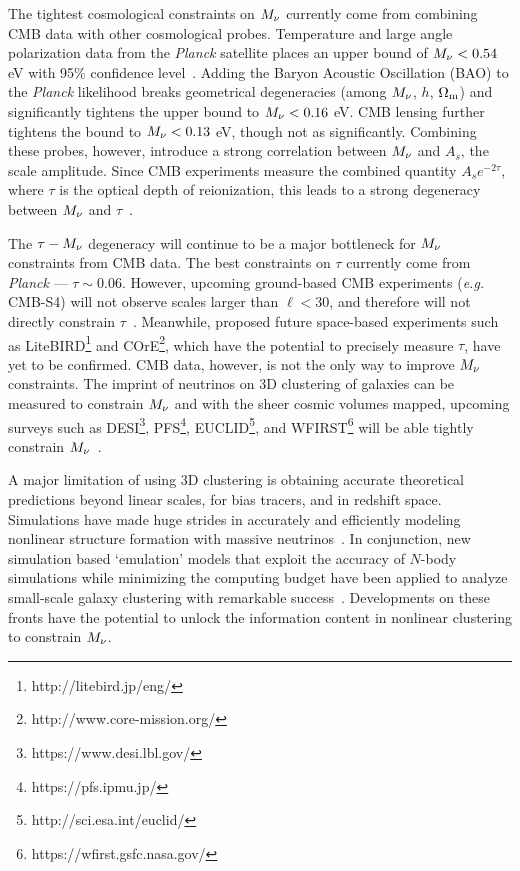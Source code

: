 The tightest cosmological constraints on $M_\nu$ currently come from 
combining CMB data with other cosmological probes. Temperature and large 
angle polarization data from the {\em Planck} satellite places an upper 
bound of $M_\nu < 0.54$ eV with 95\% confidence level~\citep{planckcollaboration2018}. 
Adding the Baryon Acoustic Oscillation (BAO) to the {\em Planck} 
likelihood breaks geometrical degeneracies (among $M_\nu$, $h$, $\Omega_{\rm m}$) 
and significantly tightens the upper bound to $M_\nu < 0.16$ eV. CMB 
lensing further tightens the bound to $M_\nu < 0.13$ eV, though 
not as significantly. Combining these probes, however, introduce a strong 
correlation between $M_\nu$ and $A_s$, the scale amplitude. Since CMB 
experiments measure the combined quantity $A_s e^{-2\tau}$, where 
$\tau$ is the optical depth of reionization, this leads to a strong 
degeneracy between $M_\nu$ and $\tau$~\citep{allison2015, liu2016, archidiacono2017}. 

The $\tau-M_\nu$ degeneracy will continue to be a major bottleneck 
for $M_\nu$ constraints from CMB data. The best constraints on $\tau$ 
currently come from {\em Planck} --- $\tau\sim0.06$. However, upcoming 
ground-based CMB experiments ({\em e.g.} CMB-S4) will not observe scales 
larger than $\ell < 30$, and therefore will not directly constrain 
$\tau$~\citep{abazajian2016}. Meanwhile, proposed future space-based 
experiments such as LiteBIRD\footnote{http://litebird.jp/eng/} and 
COrE\footnote{http://www.core-mission.org/}, which have the potential 
to precisely measure $\tau$, have yet to be confirmed. CMB data, however, 
is not the only way to improve $M_\nu$ constraints. The imprint of 
neutrinos on 3D clustering of galaxies can be measured to constrain 
$M_\nu$ and with the sheer cosmic volumes mapped, upcoming surveys such 
as DESI\footnote{https://www.desi.lbl.gov/}, PFS\footnote{https://pfs.ipmu.jp/}, 
EUCLID\footnote{http://sci.esa.int/euclid/}, and WFIRST\footnote{https://wfirst.gsfc.nasa.gov/} 
will be able tightly constrain 
$M_\nu$~\citep{audren2013, font-ribera2014, petracca2016, sartoris2016, boyle2018}.

A major limitation of using 3D clustering is obtaining accurate theoretical 
predictions beyond linear scales, for bias tracers, and in redshift space. 
Simulations have made huge strides in accurately and efficiently modeling 
nonlinear structure formation with massive neutrinos~\citep[\emph{e.g.}][]{brandbyge2008, 
villaescusa-navarro2013, castorina2015, adamek2017, emberson2017, villaescusa-navarro2018}. 
In conjunction, new simulation based `emulation' models that exploit the 
accuracy of $N$-body simulations while minimizing the computing budget 
have been applied to analyze small-scale galaxy clustering with remarkable 
success~\citep[\emph{e.g.}][]{heitmann2009, kwan2015, euclidcollaboration2018, mcclintock2018, zhai2018, wibking2019}. 
Developments on these fronts have the potential to unlock the information 
content in nonlinear clustering to constrain $M_\nu$. 

